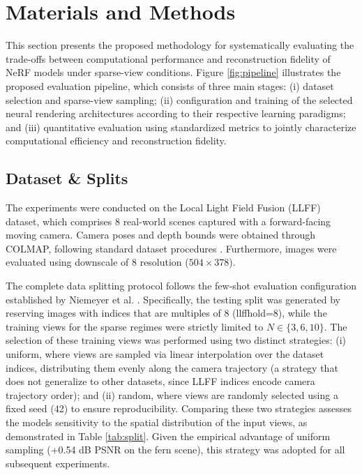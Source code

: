 \section{Materials and Methods}
\label{sec:methods}


This section presents the proposed methodology for systematically evaluating the trade-offs between computational performance and reconstruction fidelity of NeRF models under sparse-view conditions. Figure \ref{fig:pipeline} illustrates the proposed evaluation pipeline, which consists of three main stages: (i) dataset selection and sparse-view sampling; (ii) configuration and training of the selected neural rendering architectures according to their respective learning paradigms; and (iii) quantitative evaluation using standardized metrics to jointly characterize computational efficiency and reconstruction fidelity.




\subsection{Dataset \& Splits}
\label{sec:data}
The experiments were conducted on the Local Light Field Fusion (LLFF) dataset, which comprises 8 real-world scenes captured with a forward-facing moving camera. Camera poses and depth bounds were obtained through COLMAP, following standard dataset procedures \cite{mildenhall2019locallightfieldfusion}. Furthermore, images were evaluated using downscale of 8 resolution ($504 \times 378$).

The complete data splitting protocol follows the few-shot evaluation configuration established by Niemeyer et al. \cite{niemeyer2022regnerf}. Specifically, the testing split was generated by reserving images with indices that are multiples of 8 (llffhold=8), while the training views for the sparse regimes were strictly limited to $N \in \{3, 6, 10\}$. The selection of these training views was performed using two distinct strategies: (i) uniform, where views are sampled via linear interpolation over the dataset indices, distributing them evenly along the camera trajectory (a strategy that does not generalize to other datasets, since LLFF indices encode camera trajectory order); and (ii) random, where views are randomly selected using a fixed seed (42) to ensure reproducibility. Comparing these two strategies assesses the models sensitivity to the spatial distribution of the input views, as demonstrated in Table \ref{tab:split}. Given the empirical advantage of uniform sampling (+0.54 dB PSNR on the fern scene), this strategy was adopted for all subsequent experiments.

